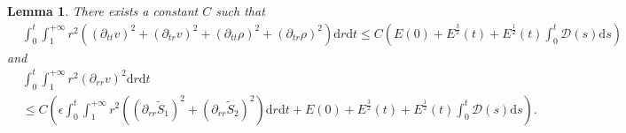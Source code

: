 \documentclass[10pt,reqno]{amsart}
\numberwithin{equation}{section}
\newtheorem{lemma}[theorem]{Lemma}
\begin{document}
	\begin{lemma}\label{lem5}
		There exists a constant $C$ such that
		\begin{equation}
			\begin{aligned}
				&\int_0^t\int_{1}^{+\infty}r^2\left((\partial_{tt}v)^2+(\partial_{tr}v)^2+(\partial_{tt}\rho)^2+(\partial_{tr}\rho)^2\right)\mathrm{d}r\mathrm{d}t
				\leq C\left(E(0)+E^{\frac{3}{2}}(t)+E^{\frac{1}{2}}(t)\int_{0}^{t} \mathcal{D}(s)\mathrm{d}s\right)
			\end{aligned}
		\end{equation}
		and
		\begin{equation}
			\begin{aligned}
				&\int_0^t\int_{1}^{+\infty}r^2(\partial_{rr}v)^2\mathrm{d}r\mathrm{d}t\\
				&\leq
				C\left(\epsilon\int_{0}^{t}\int_{1}^{+\infty}r^2((\partial_{rr}\tilde{S}_1)^2+(\partial_{rr}\tilde{S}_2)^2)\mathrm{d}r\mathrm{d}t+E(0)+E^{\frac{3}{2}}(t)+E^{\frac{1}{2}}(t)\int_{0}^{t} \mathcal{D}(s)\mathrm{d}s\right).
			\end{aligned}
		\end{equation}
	\end{lemma}
\end{document}
